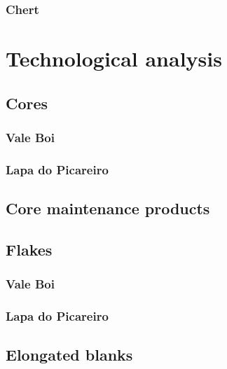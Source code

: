 \documentclass[12pt,twoside]{reedthesis}
\begin{document}
\hypertarget{chert-1}{%
\subsubsection{Chert}\label{chert-1}}

\hypertarget{technological-analysis}{%
\section{Technological analysis}\label{technological-analysis}}

\hypertarget{cores}{%
\subsection{Cores}\label{cores}}

\hypertarget{vale-boi-4}{%
\subsubsection{Vale Boi}\label{vale-boi-4}}

\hypertarget{lapa-do-picareiro-4}{%
\subsubsection{Lapa do Picareiro}\label{lapa-do-picareiro-4}}

\hypertarget{core-maintenance-products}{%
\subsection{Core maintenance products}\label{core-maintenance-products}}

\hypertarget{flakes}{%
\subsection{Flakes}\label{flakes}}

\hypertarget{vale-boi-5}{%
\subsubsection{Vale Boi}\label{vale-boi-5}}

\hypertarget{lapa-do-picareiro-5}{%
\subsubsection{Lapa do Picareiro}\label{lapa-do-picareiro-5}}

\hypertarget{elongated-blanks}{%
\subsection{Elongated blanks}\label{elongated-blanks}}
\end{document}
